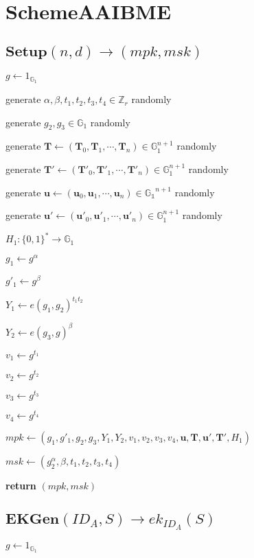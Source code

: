 \documentclass[a4paper]{article}
\begin{document}
\section{SchemeAAIBME}

\subsection{$\textbf{Setup}(n, d) \rightarrow (\textit{mpk}, \textit{msk})$}

$g \gets 1_{\mathbb{G}_1}$

generate $\alpha, \beta, t_1, t_2, t_3, t_4 \in \mathbb{Z}_r$ randomly

generate $g_2, g_3 \in \mathbb{G}_1$ randomly

generate $\bm{T} \gets (\bm{T}_0, \bm{T}_1, \cdots, \bm{T}_n) \in \mathbb{G}_1^{n + 1}$ randomly

generate $\bm{T}' \gets (\bm{T}'_0, \bm{T}'_1, \cdots, \bm{T}'_n) \in \mathbb{G}_1^{n + 1}$ randomly

generate $\bm{u} \gets (\bm{u}_0, \bm{u}_1, \cdots, \bm{u}_n) \in \mathbb{G_1}^{n + 1}$ randomly

generate $\bm{u}' \gets (\bm{u}'_0, \bm{u}'_1, \cdots, \bm{u}'_n) \in \mathbb{G}_1^{n + 1}$ randomly

$H_1: \{0, 1\}^* \rightarrow \mathbb{G}_1$

$g_1 \gets g^\alpha$

$g'_1 \gets g^\beta$

$Y_1 \gets e(g_1, g_2)^{t_1 t_2}$

$Y_2 \gets e(g_3, g)^\beta$

$v_1 \gets g^{t_1}$

$v_2 \gets g^{t_2}$

$v_3 \gets g^{t_3}$

$v_4 \gets g^{t_4}$

$ \textit{mpk} \gets (g_1, g'_1, g_2, g_3, Y_1, Y_2, v_1, v_2, v_3, v_4, \bm{u}, \bm{T}, \bm{u}', \bm{T}', H_1)$

$\textit{msk} \gets (g_2^\alpha, \beta, t_1, t_2, t_3, t_4)$

\textbf{return} $(\textit{mpk}, \textit{msk})$

\subsection{$\textbf{EKGen}(\textit{ID}_A, S) \rightarrow \textit{ek}_{\textit{ID}_A}(S)$}

$g \gets 1_{\mathbb{G}_1}$
\end{document}
